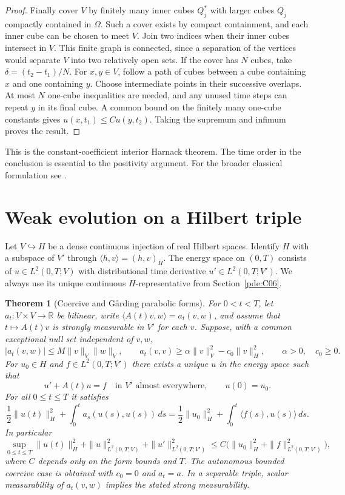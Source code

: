 \documentclass[11pt,oneside,openany]{book}
\theoremstyle{plain}
\newtheorem{theorem}{Theorem}[chapter]
\theoremstyle{definition}
\theoremstyle{remark}
\begin{document}
\begin{proof}
Finally cover \(V\) by finitely many inner cubes \(Q_j^*\)
with larger cubes \(Q_j\) compactly contained in \(\Omega\).
Such a cover exists by compact containment, and each inner
cube can be chosen to meet \(V\).
Join two indices when their inner cubes intersect in \(V\).
This finite graph is connected, since a separation of the
vertices would separate \(V\) into two relatively open sets.
If the cover has \(N\) cubes, take
\(\delta=(t_2-t_1)/N\).
For \(x,y\in V\), follow a path of cubes between a cube
containing \(x\) and one containing \(y\). Choose intermediate
points in their successive overlaps. At most \(N\) one-cube
inequalities are needed, and any unused time steps can repeat
\(y\) in its final cube. A common bound on the finitely many
one-cube constants gives \(u(x,t_1)\leq C u(y,t_2)\).
Taking the supremum and infimum proves the result.
\end{proof}

This is the constant-coefficient interior Harnack theorem.
The time order in the conclusion is essential to the positivity
argument. For the broader classical formulation see
\cite[\S 7.1.4, Theorem 10]{Evans}.


\section{Weak evolution on a Hilbert triple}
\label{pde:H05}

Let \(V\hookrightarrow H\) be a dense continuous injection of real
Hilbert spaces. Identify \(H\) with a subspace of \(V'\) through
\(\langle h,v\rangle=(h,v)_H\).
The energy space on \((0,T)\) consists of
\(u\in L^2(0,T;V)\) with distributional time derivative
\(u'\in L^2(0,T;V')\). We always use its unique continuous
\(H\)-representative from Section~\ref{pde:C06}.

\begin{theorem}[Coercive and G{\aa}rding parabolic forms]
\label{pde:parabolic-form}
For \(0<t<T\), let \(a_t:V\times V\to\mathbb R\) be bilinear,
write \(\langle A(t)v,w\rangle=a_t(v,w)\), and assume that
\(t\mapsto A(t)v\) is strongly measurable in \(V'\) for each \(v\).
Suppose, with a common exceptional null set independent of \(v,w\),
\[
 |a_t(v,w)|\leq M\|v\|_V\|w\|_V,\qquad
 a_t(v,v)\geq\alpha\|v\|_V^2-c_0\|v\|_H^2,\qquad
 \alpha>0,\quad c_0\geq0 .
\]
For \(u_0\in H\) and \(f\in L^2(0,T;V')\) there exists a unique
\(u\) in the energy space such that
\[
 u'+A(t)u=f\quad\text{in }V'\text{ almost everywhere},
 \qquad u(0)=u_0 .
\]
For all \(0\leq t\leq T\) it satisfies
\[
 \frac12\|u(t)\|_H^2+\int_0^t a_s(u(s),u(s))\,ds
 =\frac12\|u_0\|_H^2+\int_0^t\langle f(s),u(s)\rangle\,ds .
\]
In particular
\[
 \sup_{0\leq t\leq T}\|u(t)\|_H^2+
 \|u\|_{L^2(0,T;V)}^2+\|u'\|_{L^2(0,T;V')}^2
 \leq C\bigl(\|u_0\|_H^2+\|f\|_{L^2(0,T;V')}^2\bigr),
\]
where \(C\) depends only on the form bounds and \(T\).
The autonomous bounded coercive case is obtained with \(c_0=0\)
and \(a_t=a\). In a separable triple, scalar measurability of
\(a_t(v,w)\) implies the stated strong measurability.
\end{theorem}
\end{document}

